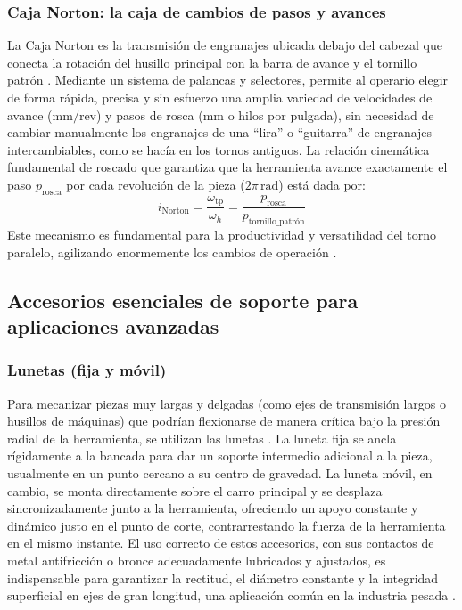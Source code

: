 \documentclass[12pt,a4paper]{article}
\begin{document}
\subsubsection{Caja Norton: la caja de cambios de pasos y avances}
La Caja Norton es la transmisión de engranajes ubicada debajo del cabezal que conecta la rotación del husillo principal con la barra de avance y el tornillo patrón \cite{degarmo2011}. Mediante un sistema de palancas y selectores, permite al operario elegir de forma rápida, precisa y sin esfuerzo una amplia variedad de velocidades de avance ($\si{\milli\meter\per\text{rev}}$) y pasos de rosca ($\si{\milli\meter}$ o hilos por pulgada), sin necesidad de cambiar manualmente los engranajes de una ``lira'' o ``guitarra'' de engranajes intercambiables, como se hacía en los tornos antiguos. La relación cinemática fundamental de roscado que garantiza que la herramienta avance exactamente el paso $p_{\text{rosca}}$ por cada revolución de la pieza ($2\pi\,\si{\radian}$) está dada por:
\begin{equation}
    i_{\text{Norton}} = \frac{\omega_{\text{tp}}}{\omega_h} = \frac{p_{\text{rosca}}}{p_{\text{tornillo\_patrón}}}
    \label{eq:relacion_norton}
\end{equation}
Este mecanismo es fundamental para la productividad y versatilidad del torno paralelo, agilizando enormemente los cambios de operación \cite{donado2008, degarmo2011}.

\subsection{Accesorios esenciales de soporte para aplicaciones avanzadas}
\subsubsection{Lunetas (fija y móvil)}
Para mecanizar piezas muy largas y delgadas (como ejes de transmisión largos o husillos de máquinas) que podrían flexionarse de manera crítica bajo la presión radial de la herramienta, se utilizan las lunetas \cite{arango2012}. La luneta fija se ancla rígidamente a la bancada para dar un soporte intermedio adicional a la pieza, usualmente en un punto cercano a su centro de gravedad. La luneta móvil, en cambio, se monta directamente sobre el carro principal y se desplaza sincronizadamente junto a la herramienta, ofreciendo un apoyo constante y dinámico justo en el punto de corte, contrarrestando la fuerza de la herramienta en el mismo instante. El uso correcto de estos accesorios, con sus contactos de metal antifricción o bronce adecuadamente lubricados y ajustados, es indispensable para garantizar la rectitud, el diámetro constante y la integridad superficial en ejes de gran longitud, una aplicación común en la industria pesada \cite{arango2012, groover2020}.
\end{document}
